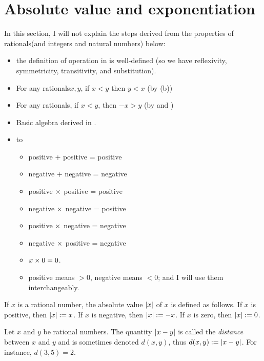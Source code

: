 \section{Absolute value and exponentiation} \label{sec 4.3}

\begin{note}
In this section, I will not explain the steps derived from the properties of rationals(and integers and natural numbers) below:
\begin{itemize}
    \item the definition of operation in  is well-defined (so we have reflexivity, symmetricity, transitivity, and substitution).
    \item For any rationals\(x, y\), if \(x < y\) then \(y < x\) (by (b))
    \item For any rationals, if \(x < y\), then \(-x > y\) (by  and )
    \item Basic algebra derived in .
    \item {} to 
        \begin{itemize}
            \item positive + positive = positive
            \item negative + negative = negative
            \item positive \(\times\) positive = positive
            \item negative \(\times\) negative = positive
            \item positive \(\times\) negative = negative
            \item negative \(\times\) positive = negative
            \item \(x \times 0 = 0\).
            \item positive means \(> 0\), negative means \(< 0\); and I will use them interchangeably.
        \end{itemize}
\end{itemize}
\end{note}

\begin{definition}  \label{def 4.3.1}
If \(x\) is a rational number, the absolute value \(\lvert x\rvert\) of \(x\) is defined as follows.
If \(x\) is positive, then \(\lvert x\rvert := x\).
If \(x\) is negative, then \(\lvert x\rvert := -x\).
If \(x\) is zero, then \(\lvert x\rvert := 0\).
\end{definition}

\begin{definition} [Distance] \label{def 4.3.2}
Let \(x\) and \(y\) be rational numbers.
The quantity \(\lvert x - y\rvert\) is called the \emph{distance} between \(x\) and \(y\) and is sometimes denoted \(d(x, y)\), thus \(d(x, y) := \lvert x - y\rvert\).
For instance, \(d(3, 5) = 2\).
\end{definition}

